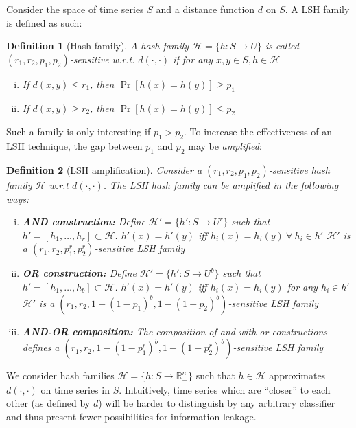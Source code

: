 \documentclass[a4paper]{article}
\theoremstyle{def}
\newtheorem{definition}{Definition}
\theoremstyle{thm}
\newcommand{\R}[0]{\mathbb{R}}
\newcommand{\LSH}[0]{\mathcal{H}}
\begin{document}
Consider the space of time series $S$ and a distance function $d$ on $S$.
A LSH family is defined as such:

\begin{definition}[Hash family]\label{defn:hash_family}
    A hash family ${\LSH} = \{ h : S \rightarrow U \}$ is called $(r_1, r_2, p_1, p_2)$-sensitive w.r.t. $d(\cdot,\cdot)$ if for any $x,y \in S, h \in {\LSH}$
    \begin{enumerate}[(i)]
        \item\label{itm:hash_def1} If $d(x,y) \le r_1$, then $\Pr[h(x) = h(y)] \ge p_1$
        \item\label{itm:hash_def2} If $d(x,y) \ge r_2$, then $\Pr[h(x) = h(y)] \le p_2$
    \end{enumerate}
\end{definition}

Such a family is only interesting if $p_1 > p_2$.
To increase the effectiveness of an LSH technique, the gap between $p_1$ and $p_2$ may be \textit{amplified}:

\begin{definition}[LSH amplification]\label{defn:lsh_amplification}
    Consider a $(r_1, r_2, p_1, p_2)$-sensitive hash family ${\LSH}$ w.r.t $d(\cdot,\cdot)$. The LSH hash family can be amplified in the following ways:
    \begin{enumerate}[(i)]
        \item \textbf{AND construction:} Define ${\LSH}' = \{h' : S \rightarrow U^r\}$ such that $h' = [h_1, \ldots, h_r] \subset {\LSH}$.
            $h'(x) = h'(y)$ iff $h_i(x) = h_i(y) ~\forall~h_i \in h'$
            $\mathcal{H'}$ is a $(r_1, r_2, p_1^r, p_2^r)$-sensitive LSH family
        \item \textbf{OR construction:} Define ${\LSH}' = \{h' : S \rightarrow U^b\}$ such that $h' = [h_1, \ldots, h_b] \subset {\LSH}$.
            $h'(x) = h'(y)$ iff $h_i(x) = h_i(y)$ for any $h_i \in h'$
            $\mathcal{H'}$ is a $(r_1, r_2, 1-{(1-p_1)}^b, 1-{(1-p_2)}^b)$-sensitive LSH family
        \item \textbf{AND-OR composition:} The composition of \textnormal{and} with \textnormal{or} constructions defines a $(r_1, r_2, 1-{(1-p_1^r)}^b, 1-{(1-p_2^r)}^b)$-sensitive LSH family
    \end{enumerate}
\end{definition}

We consider hash families ${\LSH} = \{h : S \rightarrow \R_{+}^n\}$ such that $h \in {\LSH}$ approximates $d(\cdot,\cdot)$ on time series in $S$.
Intuitively, time series which are ``closer'' to each other (as defined by $d$) will be harder to distinguish by any arbitrary classifier and thus present fewer possibilities for information leakage.
\end{document}
